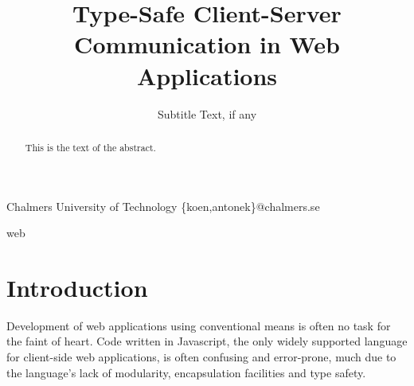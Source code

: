 \documentclass[preprint]{sigplanconf}
\begin{document}
\setlength{\pdfpageheight}{\paperheight}
\setlength{\pdfpagewidth}{\paperwidth}






\title{Type-Safe Client-Server Communication in Web Applications}
\subtitle{Subtitle Text, if any}

           {Chalmers University of Technology}
           {\{koen,antonek\}@chalmers.se}

\maketitle

\begin{abstract}
This is the text of the abstract.
\end{abstract}


%
\keywords
web

\section{Introduction}

Development of web applications using conventional means is often no task for
the faint of heart. Code written in Javascript, the only widely supported
language for client-side web applications, is often confusing and error-prone,
much due to the language's lack of modularity, encapsulation facilities and
type safety.
\end{document}
